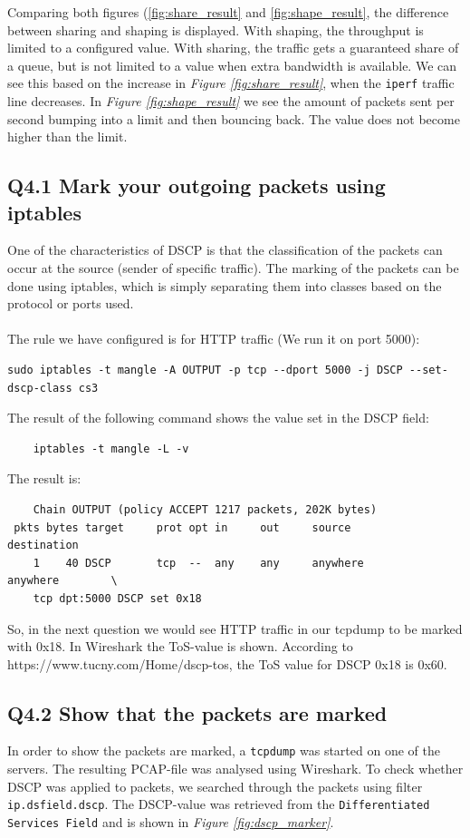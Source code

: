 \documentclass{article}
\begin{document}
Comparing both figures (\ref{fig:share_result} and \ref{fig:shape_result}, the difference between sharing and shaping is displayed. With shaping, the throughput is limited to a configured value. With sharing, the traffic gets a guaranteed share of a queue, but is not limited to a value when extra bandwidth is available. We can see this based on the increase in \textit{Figure \ref{fig:share_result}}, when the \texttt{iperf} traffic line decreases. In \textit{Figure \ref{fig:shape_result}} we see the amount of packets sent per second bumping into a limit and then bouncing back. The value does not become higher than the limit.

\subsection{Q4.1 Mark your outgoing packets using iptables}
One of the characteristics of DSCP is that the classification of the packets can occur at the source (sender of specific traffic). The marking of the packets can be done using iptables, which is simply separating them into classes based on the protocol or ports used.\\
\\
The rule we have configured is for HTTP traffic (We run it on port 5000):

\begin{verbatim}
sudo iptables -t mangle -A OUTPUT -p tcp --dport 5000 -j DSCP --set-dscp-class cs3
\end{verbatim}

The result of the following command shows the value set in the DSCP field:
\begin{verbatim}
    iptables -t mangle -L -v
\end{verbatim}

The result is:
\begin{verbatim}
    Chain OUTPUT (policy ACCEPT 1217 packets, 202K bytes)
 pkts bytes target     prot opt in     out     source               destination         
    1    40 DSCP       tcp  --  any    any     anywhere             anywhere        \    
    tcp dpt:5000 DSCP set 0x18
\end{verbatim}

So, in the next question we would see HTTP traffic in our tcpdump to be marked with 0x18. In Wireshark the ToS-value is shown. According to https://www.tucny.com/Home/dscp-tos, the ToS value for DSCP 0x18 is 0x60.

\subsection{Q4.2 Show that the packets are marked}
In order to show the packets are marked, a \texttt{tcpdump} was started on one of the servers. The resulting PCAP-file was analysed using Wireshark. To check whether DSCP was applied to packets, we searched through the packets using filter \texttt{ip.dsfield.dscp}. The DSCP-value was retrieved from the \texttt{Differentiated Services Field} and is shown in \textit{Figure \ref{fig:dscp_marker}}. 
\end{document}
